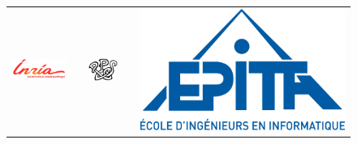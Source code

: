 \begin{titlepage}
\begin{center}
\begin{figure}[h]
\begin{tabular}{ccccc}
\includegraphics[scale=0.8]{../data/inria.jpg} & &
\includegraphics{../data/pps.png} & &
\includegraphics[scale=0.8]{../data/epita.jpg}
\end{tabular}
\end{figure}

\end{center}
\end{titlepage}
